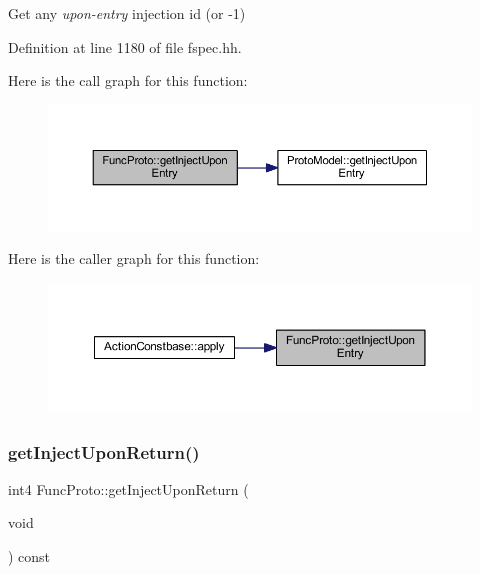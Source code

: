 Get any {\itshape upon-\/entry} injection id (or -\/1) 



Definition at line 1180 of file fspec.\+hh.

Here is the call graph for this function\+:
\nopagebreak
\begin{figure}[H]
\begin{center}
\leavevmode
\includegraphics[width=350pt]{class_func_proto_aa68fc3fa0f616ed233026bcb415a1143_cgraph}
\end{center}
\end{figure}
Here is the caller graph for this function\+:
\nopagebreak
\begin{figure}[H]
\begin{center}
\leavevmode
\includegraphics[width=350pt]{class_func_proto_aa68fc3fa0f616ed233026bcb415a1143_icgraph}
\end{center}
\end{figure}
\mbox{\label{class_func_proto_a3c835c084a2714801d06d68631aa52ec}} 
\subsubsection{\texorpdfstring{getInjectUponReturn()}{getInjectUponReturn()}}
{\footnotesize\ttfamily int4 Func\+Proto\+::get\+Inject\+Upon\+Return (\begin{DoxyParamCaption}\item[{void}]{ }\end{DoxyParamCaption}) const\hspace{0.3cm}{\ttfamily [inline]}}



